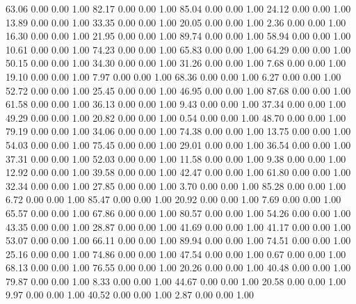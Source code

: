    63.06   0.00   0.00   1.00
   82.17   0.00   0.00   1.00
   85.04   0.00   0.00   1.00
   24.12   0.00   0.00   1.00
   13.89   0.00   0.00   1.00
   33.35   0.00   0.00   1.00
   20.05   0.00   0.00   1.00
    2.36   0.00   0.00   1.00
   16.30   0.00   0.00   1.00
   21.95   0.00   0.00   1.00
   89.74   0.00   0.00   1.00
   58.94   0.00   0.00   1.00
   10.61   0.00   0.00   1.00
   74.23   0.00   0.00   1.00
   65.83   0.00   0.00   1.00
   64.29   0.00   0.00   1.00
   50.15   0.00   0.00   1.00
   34.30   0.00   0.00   1.00
   31.26   0.00   0.00   1.00
    7.68   0.00   0.00   1.00
   19.10   0.00   0.00   1.00
    7.97   0.00   0.00   1.00
   68.36   0.00   0.00   1.00
    6.27   0.00   0.00   1.00
   52.72   0.00   0.00   1.00
   25.45   0.00   0.00   1.00
   46.95   0.00   0.00   1.00
   87.68   0.00   0.00   1.00
   61.58   0.00   0.00   1.00
   36.13   0.00   0.00   1.00
    9.43   0.00   0.00   1.00
   37.34   0.00   0.00   1.00
   49.29   0.00   0.00   1.00
   20.82   0.00   0.00   1.00
    0.54   0.00   0.00   1.00
   48.70   0.00   0.00   1.00
   79.19   0.00   0.00   1.00
   34.06   0.00   0.00   1.00
   74.38   0.00   0.00   1.00
   13.75   0.00   0.00   1.00
   54.03   0.00   0.00   1.00
   75.45   0.00   0.00   1.00
   29.01   0.00   0.00   1.00
   36.54   0.00   0.00   1.00
   37.31   0.00   0.00   1.00
   52.03   0.00   0.00   1.00
   11.58   0.00   0.00   1.00
    9.38   0.00   0.00   1.00
   12.92   0.00   0.00   1.00
   39.58   0.00   0.00   1.00
   42.47   0.00   0.00   1.00
   61.80   0.00   0.00   1.00
   32.34   0.00   0.00   1.00
   27.85   0.00   0.00   1.00
    3.70   0.00   0.00   1.00
   85.28   0.00   0.00   1.00
    6.72   0.00   0.00   1.00
   85.47   0.00   0.00   1.00
   20.92   0.00   0.00   1.00
    7.69   0.00   0.00   1.00
   65.57   0.00   0.00   1.00
   67.86   0.00   0.00   1.00
   80.57   0.00   0.00   1.00
   54.26   0.00   0.00   1.00
   43.35   0.00   0.00   1.00
   28.87   0.00   0.00   1.00
   41.69   0.00   0.00   1.00
   41.17   0.00   0.00   1.00
   53.07   0.00   0.00   1.00
   66.11   0.00   0.00   1.00
   89.94   0.00   0.00   1.00
   74.51   0.00   0.00   1.00
   25.16   0.00   0.00   1.00
   74.86   0.00   0.00   1.00
   47.54   0.00   0.00   1.00
    0.67   0.00   0.00   1.00
   68.13   0.00   0.00   1.00
   76.55   0.00   0.00   1.00
   20.26   0.00   0.00   1.00
   40.48   0.00   0.00   1.00
   79.87   0.00   0.00   1.00
    8.33   0.00   0.00   1.00
   44.67   0.00   0.00   1.00
   20.58   0.00   0.00   1.00
    9.97   0.00   0.00   1.00
   40.52   0.00   0.00   1.00
    2.87   0.00   0.00   1.00
